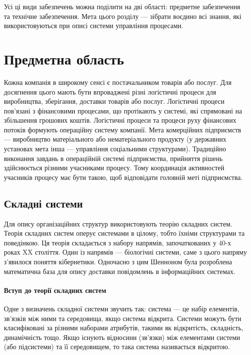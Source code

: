 \documentclass{memoir}
\begin{document}
Усі ці види забезпечень можна поділити на дві області: предметне забезпечення та технічне забезпечення. Мета цього розділу — зібрати воєдино всі знання, які використовуються при описі системи управління процесами.

\section{Предметна область}

Кожна компанія в широкому сенсі є постачальником товарів або послуг. Для досягнення цього мають бути впроваджені різні логістичні процеси для виробництва, зберігання, доставки товарів або послуг. Логістичні процеси пов’язані з фінансовими процесами, що протікають у системі, які спрямовані на збільшення грошових коштів. Логістичні процеси та процеси руху фінансових потоків формують операційну систему компанії. Мета комерційних підприємств — виробництво матеріального або нематеріального продукту (у державних установах мета інша — управління соціальними структурами). Традиційно виконання завдань в операційній системі підприємства, прийняття рішень здійснюється різними учасниками процесу. Тому координація активностей учасників процесу має бути такою, щоб відповідати головній меті підприємства.

\subsection{Складні системи}

Для опису організаційних структур використовують теорію складних систем. Теорія складних систем оперує системами в цілому, тобто їхніми структурами та поведінкою. Ця теорія складається з набору напрямів, започаткованих у 40-х роках XX століття. Один із напрямів — біологічні системи, саме з цього напряму з’явилося поняття кібернетики. Одночасно з цим Шенноном була розроблена математична база для опису доставки повідомлень в інформаційних системах.

\paragraph{Вступ до теорії складних систем}

Одне з визначень складної системи звучить так: система — це набір елементів, зв’язків між ними та середовища, якщо система відкрита. Системи можуть бути класифіковані за різними наборами атрибутів, такими як відкритість, складність, динамічність тощо. Якщо існують відносини (зв’язки) між елементами системи (або підсистеми) та її середовищем, то така система називається відкритою.
\end{document}
